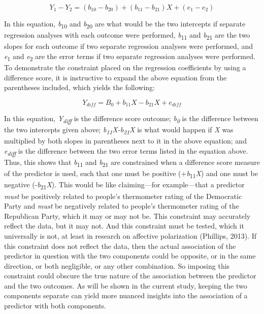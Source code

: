 \documentclass[authordate, meta]{jote-new-article}
\begin{document}
	\begin{equation}
		Y_1-Y_2=(b_{10}-b_{20})+(b_{11}-b_{21})X+(e_1-e_2)
	\end{equation}



	In this equation, \emph{b}\textsubscript{10} and \emph{b}\textsubscript{20} are what would be the two intercepts if separate regression analyses with each outcome were performed, \emph{b}\textsubscript{11} and \emph{b}\textsubscript{21} are the two slopes for each outcome if two separate regression analyses were performed, and \emph{e}\textsubscript{1} and \emph{e}\textsubscript{2} are the error terms if two separate regression analyses were performed. To demonstrate the constraint placed on the regression coefficients by using a difference score, it is instructive to expand the above equation from the parentheses included, which yields the following:



	\begin{equation}
		Y_{diff}=B_0+b_{11}X-b_{21}X+e_{diff}
	\end{equation}



	In this equation, \emph{Y\textsubscript{diff}} is the difference score outcome; \emph{b\textsubscript{0}} is the difference between the two intercepts given above; \emph{b\textsubscript{11}X-b\textsubscript{21}X} is what would happen if \emph{X} was multiplied by both slopes in parentheses next to it in the above equation; and \emph{e\textsubscript{diff}} is the difference between the two error terms listed in the equation above. Thus, this shows that \emph{b}\textsubscript{11} and \emph{b}\textsubscript{21} are constrained when a difference score measure of the predictor is used, such that one must be positive (+\emph{b}\textsubscript{11}\emph{X}) and one must be negative (-\emph{b}\textsubscript{21}\emph{X}). This would be like claiming—for example—that a predictor \emph{must} be positively related to people's thermometer rating of the Democratic Party and \emph{must }be negatively related to people's thermometer rating of the Republican Party, which it may or may not be. This constraint may accurately reflect the data, but it may not. And this constraint must be tested, which it universally is not, at least in research on affective polarization (Phillips, 2013). If this constraint does not reflect the data, then the actual association of the predictor in question with the two components could be opposite, or in the same direction, or both negligible, or any other combination. So imposing this constraint could obscure the true nature of the association between the predictor and the two outcomes. As will be shown in the current study, keeping the two components separate can yield more nuanced insights into the association of a predictor with both components.
\end{document}
